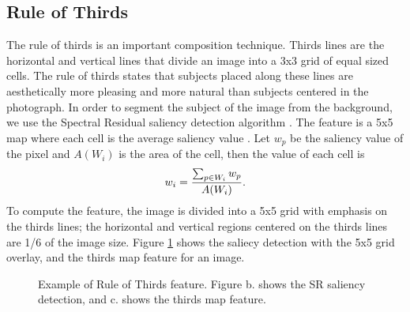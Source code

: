 \documentclass[conference,a4paper]{IEEEtran}
\begin{document}
  \subsection{Rule of Thirds}
  The rule of thirds is an important composition technique.  Thirds lines are the horizontal and vertical lines that divide an image into a 3x3 grid of equal sized cells.  The rule of thirds states that subjects placed along these lines are aesthetically more pleasing and more natural than subjects centered in the photograph.  In order to segment the subject of the image from the background, we use the Spectral Residual saliency detection algorithm \cite{hou2007saliency}.  The feature is a 5x5 map where each cell is the average saliency value \cite{mai2011rule}.  Let $w_p$ be the saliency value of the pixel and $A(W_i)$ is the area of the cell, then the value of each cell is
  \begin{equation}
    w_i = {\sum_{p \in W_i} w_p \over A(W_i)} .
  \end{equation}
  To compute the feature, the image is divided into a 5x5 grid with emphasis on the thirds lines; the horizontal and vertical regions centered on the thirds lines are 1/6 of the image size.  Figure \ref{fig:rot} shows the saliecy detection with the 5x5 grid overlay, and the thirds map feature for an image.

\begin{figure}
  \centering
  \caption{
    Example of Rule of Thirds feature.  Figure b. shows the SR saliency detection, and c. shows the thirds map feature.
  }
  \label{fig:rot}
\end{figure}
\end{document}
